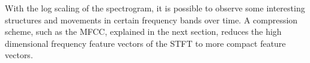 \FloatBarrier
\noindent
With the log scaling of the spectrogram, it is possible to observe some interesting structures and movements in certain frequency bands over time.
A compression scheme, such as the MFCC, explained in the next section, reduces the high dimensional frequency feature vectors of the STFT to more compact feature vectors.